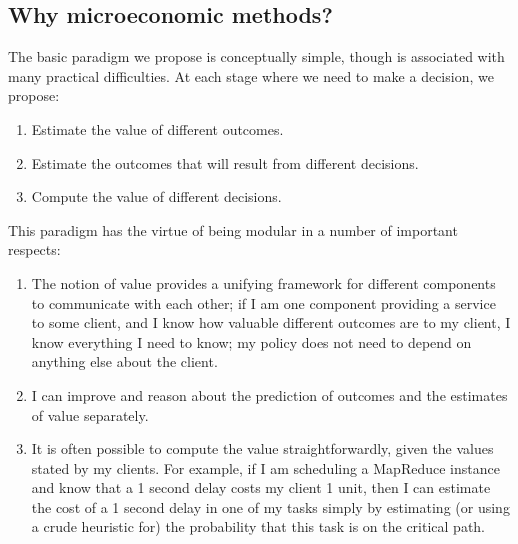 \documentclass{acm_proc_article-sp}
\begin{document}
\subsection{Why microeconomic methods?}
The basic paradigm we propose is conceptually simple, though is associated with
many practical difficulties. At each stage where we need to make a decision, we
propose:
\begin{enumerate}
  \item Estimate the value of different outcomes.
  \item Estimate the outcomes that will result from different decisions.
  \item Compute the value of different decisions.
\end{enumerate}
    
This paradigm has the virtue of being modular in a number of important respects:
\begin{enumerate}
  \item The notion of value provides a unifying framework for different
    components to communicate with each other; if I am one component providing a
    service to some client, and I know how valuable different outcomes are to my
    client, I know everything I need to know; my policy does not need to depend
    on anything else about the client.
  \item I can improve and reason about the prediction of outcomes and the
    estimates of value separately. 
  \item It is often possible to compute the value straightforwardly, given the
    values stated  by my clients. For example, if I am scheduling a MapReduce
    instance and know that a 1 second delay costs my client 1 unit, then I can
    estimate the cost of a 1 second delay in one of my tasks simply by
    estimating (or using a crude heuristic for) the probability that this task
    is on the critical path.
\end{enumerate}
\end{document}
